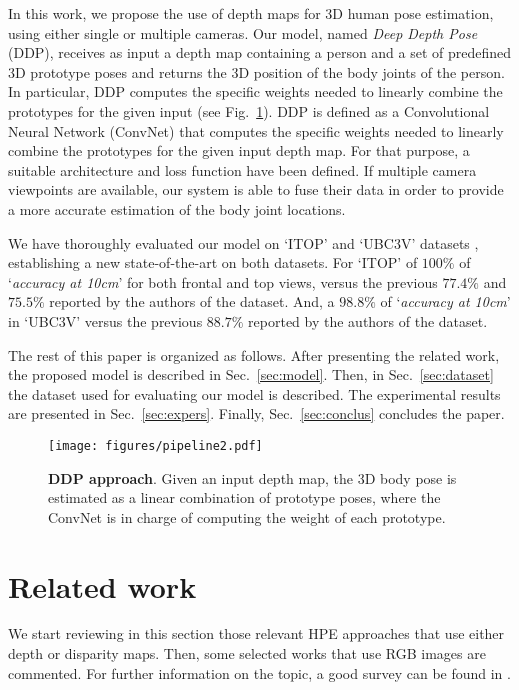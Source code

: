 \documentclass[review,12pt,3p]{elsarticle}
\begin{document}
%
In this work, we propose the use of depth maps for 3D human pose estimation, using either single or multiple cameras. 
Our model, named \textit{Deep Depth Pose} (DDP), receives as input a depth map containing a person 
and a set of predefined 3D prototype poses and returns the 3D position of the body joints of the person. In particular, DDP computes the specific weights needed to linearly combine the prototypes for the given input (see Fig.~\ref{fig:teaser}). 
DDP is defined as a Convolutional Neural Network (ConvNet) \citep{Le1998} that computes the specific weights needed to linearly combine the prototypes for the given input depth map. For that purpose, a suitable architecture and loss function have been defined.
%
If multiple camera viewpoints are available, our system is able to fuse their data in order to provide a more accurate estimation of the body joint locations.


We have thoroughly evaluated our model on `ITOP' \cite{haque2016eccv} and `UBC3V' datasets \citep{Shafaei16}, establishing a new state-of-the-art on both datasets. For `ITOP' of $100\%$ of `\textit{accuracy at 10cm}' for both frontal and top views, versus the previous $77.4\%$ and $75.5\%$ reported by the authors of the dataset.
%
And, a $98.8\%$ of `\textit{accuracy at 10cm}' in `UBC3V' versus the previous $88.7\%$ reported by the authors of the dataset.


The rest of this paper is organized as follows. After presenting the related work, the proposed model is described in Sec.~\ref{sec:model}. Then, in Sec.~\ref{sec:dataset} the dataset used for evaluating our model is described. The experimental results are presented in Sec.~\ref{sec:expers}. Finally, Sec.~\ref{sec:conclus} concludes the paper.

\begin{figure}[t]
\centering
  \texttt{[image: figures/pipeline2.pdf]}
  \caption{\textbf{DDP approach}. Given an input depth map, the 3D body pose is estimated as a linear combination of prototype poses, where the ConvNet is in charge of computing the weight of each prototype.}
  \label{fig:teaser}
\end{figure}

\section{Related work} \label{sec:relworks}
%
We start reviewing in this section those relevant HPE approaches that use either depth or disparity maps. Then, some selected works that use RGB images are commented. 
For further information on the topic, a good survey can be found in \citep{liu2015}.
\end{document}

